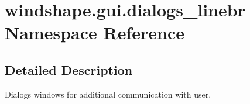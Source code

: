 \hypertarget{namespacewindshape_1_1gui_1_1dialogs__linebr}{}\section{windshape.\+gui.\+dialogs\+\_\+linebr Namespace Reference}
\label{namespacewindshape_1_1gui_1_1dialogs__linebr}


\subsection{Detailed Description}
\begin{DoxyVerb}Dialogs windows for additional communication with user.
\end{DoxyVerb}
 
